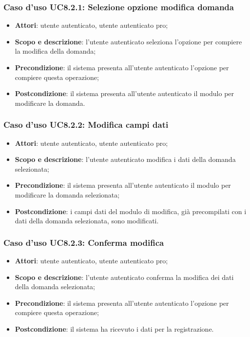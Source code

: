 	\subsubsection{Caso d'uso UC8.2.1: Selezione opzione modifica domanda}
	\begin{itemize}
		\item
			\textbf{Attori}: utente autenticato, utente autenticato pro;
		\item
			\textbf{Scopo e descrizione}: l'utente autenticato seleziona l'opzione per compiere la modifica della domanda;
		\item		
			\textbf{Precondizione}: il sistema presenta all'utente autenticato l'opzione per compiere questa operazione;
		\item
			\textbf{Postcondizione}: il sistema presenta all'utente autenticato il modulo per modificare la domanda.
	\end{itemize}
	\subsubsection{Caso d'uso UC8.2.2: Modifica campi dati}
	\begin{itemize}
		\item
			\textbf{Attori}: utente autenticato, utente autenticato pro;
		\item
			\textbf{Scopo e descrizione}: l'utente autenticato modifica i dati della domanda selezionata;
		\item		
			\textbf{Precondizione}: il sistema presenta all'utente autenticato il modulo per modificare la domanda selezionata;
		\item
			\textbf{Postcondizione}: i campi dati del modulo di modifica, già precompilati con i dati della domanda selezionata, sono modificati.
	\end{itemize}		
	\subsubsection{Caso d'uso UC8.2.3: Conferma modifica}
	\begin{itemize}
		\item
			\textbf{Attori}: utente autenticato, utente autenticato pro;
		\item
			\textbf{Scopo e descrizione}: l'utente autenticato conferma la modifica dei dati della domanda selezionata;
		\item		
			\textbf{Precondizione}: il sistema presenta all'utente autenticato l'opzione per compiere questa operazione;
		\item
			\textbf{Postcondizione}: il sistema ha ricevuto i dati per la registrazione.
	\end{itemize}		
